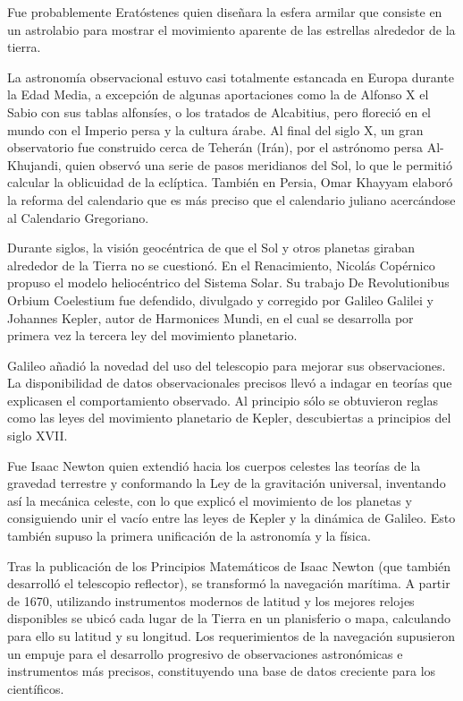 Fue probablemente Eratóstenes quien diseñara la esfera armilar que consiste en un astrolabio para mostrar el movimiento aparente de las estrellas alrededor de la tierra.

La astronomía observacional estuvo casi totalmente estancada en Europa durante la Edad Media, a excepción de algunas aportaciones como la de Alfonso X el Sabio con sus tablas alfonsíes, o los tratados de Alcabitius, pero floreció en el mundo con el Imperio persa y la cultura árabe. Al final del siglo X, un gran observatorio fue construido cerca de Teherán (Irán), por el astrónomo persa Al-Khujandi, quien observó una serie de pasos meridianos del Sol, lo que le permitió calcular la oblicuidad de la eclíptica. También en Persia, Omar Khayyam elaboró la reforma del calendario que es más preciso que el calendario juliano acercándose al Calendario Gregoriano.

Durante siglos, la visión geocéntrica de que el Sol y otros planetas giraban alrededor de la Tierra no se cuestionó. En el Renacimiento, Nicolás Copérnico propuso el modelo heliocéntrico del Sistema Solar. Su trabajo De Revolutionibus Orbium Coelestium fue defendido, divulgado y corregido por Galileo Galilei y Johannes Kepler, autor de Harmonices Mundi, en el cual se desarrolla por primera vez la tercera ley del movimiento planetario.

Galileo añadió la novedad del uso del telescopio para mejorar sus observaciones. La disponibilidad de datos observacionales precisos llevó a indagar en teorías que explicasen el comportamiento observado. Al principio sólo se obtuvieron reglas como las leyes del movimiento planetario de Kepler, descubiertas a principios del siglo XVII.

Fue Isaac Newton quien extendió hacia los cuerpos celestes las teorías de la gravedad terrestre y conformando la Ley de la gravitación universal, inventando así la mecánica celeste, con lo que explicó el movimiento de los planetas y consiguiendo unir el vacío entre las leyes de Kepler y la dinámica de Galileo. Esto también supuso la primera unificación de la astronomía y la física.

Tras la publicación de los Principios Matemáticos de Isaac Newton (que también desarrolló el telescopio reflector), se transformó la navegación marítima. A partir de 1670, utilizando instrumentos modernos de latitud y los mejores relojes disponibles se ubicó cada lugar de la Tierra en un planisferio o mapa, calculando para ello su latitud y su longitud. Los requerimientos de la navegación supusieron un empuje para el desarrollo progresivo de observaciones astronómicas e instrumentos más precisos, constituyendo una base de datos creciente para los científicos.

